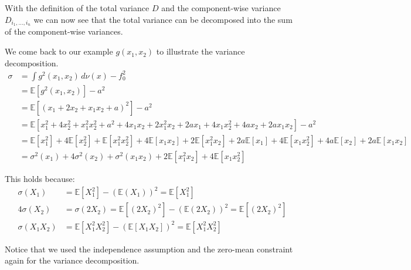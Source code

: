 With the definition of the total variance $D$ and the component-wise variance $D_{i_{1}, \dots, i_{n}}$ we can now see that the total variance can be decomposed into the sum of the component-wise variances.

We come back to our example \( g(x_1, x_2) \) to illustrate the variance decomposition.
\begin{align*}
    \sigma &= \int g^2(x_1, x_2)\, d\nu(x) - f_{0}^2 \\
    &= \mathbb{E}[g^2(x_1, x_2)] - a^2 \\
    &= \mathbb{E}[(x_1 + 2x_2 + x_1x_2 + a)^2] - a^2 \\
    &= \mathbb{E}\left[
        x_1^2 + 4x_2^2 + x_1^2x_2^2 + a^2
        + 4x_1x_2 + 2x_1^2x_2 + 2a x_1
        + 4x_1x_2^2 + 4a x_2 + 2a x_1x_2
    \right] - a^2 \\
    &= \mathbb{E}[x_1^2] + 4\mathbb{E}[x_2^2] + \mathbb{E}[x_1^2x_2^2]
    + 4\mathbb{E}[x_1x_2] + 2\mathbb{E}[x_1^2x_2]
    + 2a\mathbb{E}[x_1] + 4\mathbb{E}[x_1x_2^2]
    + 4a\mathbb{E}[x_2] + 2a\mathbb{E}[x_1x_2] \\
    &= \sigma^2(x_1) + 4\sigma^2(x_2) + \sigma^2(x_1x_2) + 2\mathbb{E}[x_1^2x_2] + 4\mathbb{E}[x_1x_2^2]
\end{align*}

This holds because:
\begin{align*}
    \sigma(X_1) &= \mathbb{E}[X_1^2] - (\mathbb{E}(X_1))^2 = \mathbb{E}[X_1^2] \\
    4\sigma(X_2) &=  \sigma(2X_2) = \mathbb{E}[(2X_2)^2] - (\mathbb{E}(2X_2))^2 = \mathbb{E}[(2X_2)^2] \\
    \sigma(X_1X_2) &= \mathbb{E}[X_1^2X_2^2] - (\mathbb{E}[X_1X_2])^2 = \mathbb{E}[X_1^2X_2^2]
\end{align*}

Notice that we used the independence assumption and the zero-mean constraint again for the variance decomposition.






